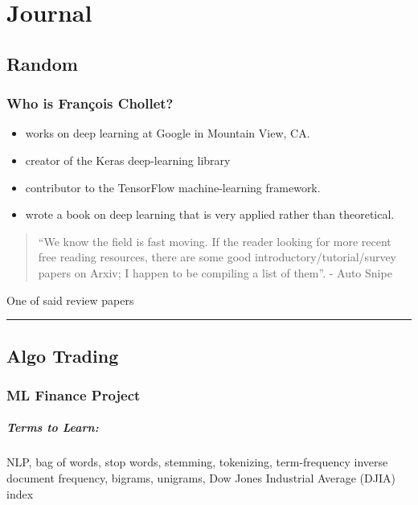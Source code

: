 
\chapter{Journal}
\section{Random}

\subsection*{Who is François Chollet?}
\begin{itemize}
\item
	works on deep learning at Google in Mountain View, CA.
\item
	creator of the Keras deep-learning library
\item
	contributor to the TensorFlow machine-learning framework.
\item
	wrote a book on deep learning that is very applied rather than theoretical.
\end{itemize}

\begin{quote}
``We know the field is fast moving. If the reader looking for more recent free reading resources, there are some good introductory/tutorial/survey papers on Arxiv; I happen to be compiling a list of them''. - Auto Snipe
\end{quote}

 One of said review papers \cite{raghu2020survey}


\hrule
\section{Algo Trading}

\subsection{ML Finance Project}

\paragraph*{Terms to Learn: } NLP, bag of words, stop words, stemming, tokenizing, term-frequency inverse document frequency, bigrams, unigrams, Dow Jones Industrial Average (DJIA) index

